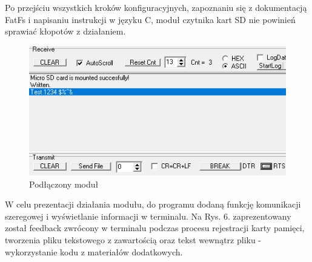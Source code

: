 \documentclass[11pt, a4paper]{article}
\begin{document}
Po przejściu wszystkich kroków konfiguracyjnych, zapoznaniu się z dokumentacją FatFs i napisaniu instrukcji w języku C, moduł czytnika kart SD nie powinień sprawiać kłopotów z działaniem. 
\begin{figure}[h!]
\centering
\includegraphics[width=1\linewidth]{fig/KY-018/działanie_ukladu/terminal.png}
\caption{Podłączony moduł}
\label{fig:sub2}
\end{figure}
\newline
W celu prezentacji działania modułu, do programu dodaną funkcję komunikacji szeregowej i wyświetlanie informacji w terminalu. Na Rys. 6. zaprezentowany został feedback zwrócony w terminalu podczas procesu rejestracji karty pamięci, tworzenia pliku tekstowego z zawartością oraz tekst wewnątrz pliku - wykorzystanie kodu z materiałów dodatkowych.
\end{document}
